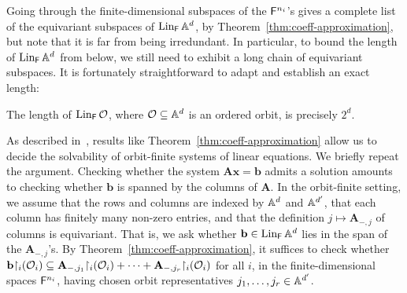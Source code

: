 Going through the finite-dimensional subspaces of the $\FF^{n_i}$'s gives a complete list of the equivariant subspaces of $\Lin_\FF \A^d$, by Theorem~\ref{thm:coeff-approximation}, but note that it is far from being irredundant.
In particular, to bound the length of $\Lin_\FF \A^d$ from below, we still need to exhibit a long chain of equivariant subspaces.
It is fortunately straightforward to adapt \cite[Cor.~4.12]{BFKM24} and establish an exact length:
\begin{corollary}\label{cor:2d-length}
    The length of $\Lin_\FF \cal O$, where $\cal O \subseteq \A^d$ is an ordered orbit, is precisely $2^d$.
\end{corollary}

As described in~\cite[Sec.~9]{GhoshLasota_24}, results like Theorem~\ref{thm:coeff-approximation} allow us to decide the solvability of orbit-finite systems of linear equations. 
We briefly repeat the argument.
Checking whether the system $\mathbf{A} \mathbf{x} = \mathbf{b}$ admits a solution amounts to checking whether $\mathbf{b}$ is spanned by the columns of $\mathbf{A}$.
In the orbit-finite setting, we assume that the rows and columns are indexed by $\A^d$ and $\A^{d'}$, that each column has finitely many non-zero entries, and that the definition $j \mapsto \mathbf{A}_{-, j}$ of columns is equivariant.
That is, we ask whether $\mathbf{b} \in \Lin_\FF \A^d$ lies in the span of the $\mathbf{A}_{-, j}$'s. 
By Theorem~\ref{thm:coeff-approximation}, it suffices to check whether $\mathbf{b} {\restriction_i} (\cal O_i) \subseteq \mathbf{A}_{-, j_1} {\restriction_i} (\cal O_i) + \cdots + \mathbf{A}_{-, j_r} {\restriction_i} (\cal O_i)$ for all $i$, in the finite-dimensional spaces $\FF^{n_i}$, having chosen orbit representatives $j_1, \dots, j_r \in \A^{d'}$.
